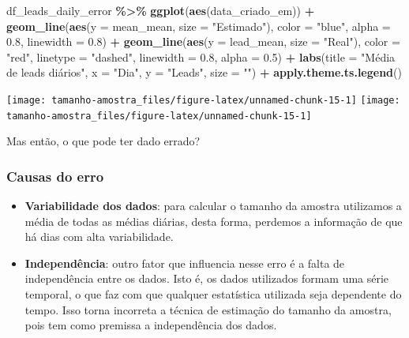 \documentclass[
]{article}
\newenvironment{Shaded}{\begin{snugshade}}{\end{snugshade}}
\newcommand{\AttributeTok}[1]{\textcolor[rgb]{0.13,0.29,0.53}{#1}}
\newcommand{\FloatTok}[1]{\textcolor[rgb]{0.00,0.00,0.81}{#1}}
\newcommand{\FunctionTok}[1]{\textcolor[rgb]{0.13,0.29,0.53}{\textbf{#1}}}
\newcommand{\NormalTok}[1]{#1}
\newcommand{\SpecialCharTok}[1]{\textcolor[rgb]{0.81,0.36,0.00}{\textbf{#1}}}
\newcommand{\StringTok}[1]{\textcolor[rgb]{0.31,0.60,0.02}{#1}}
\providecommand{\tightlist}{%
  \setlength{\itemsep}{0pt}\setlength{\parskip}{0pt}}
\begin{document}
\begin{Shaded}
\begin{Highlighting}[]
\NormalTok{df\_leads\_daily\_error }\SpecialCharTok{\%\textgreater{}\%}
  \FunctionTok{ggplot}\NormalTok{(}\FunctionTok{aes}\NormalTok{(data\_criado\_em)) }\SpecialCharTok{+}
  \FunctionTok{geom\_line}\NormalTok{(}\FunctionTok{aes}\NormalTok{(}\AttributeTok{y =}\NormalTok{ mean\_mean, }\AttributeTok{size =} \StringTok{"Estimado"}\NormalTok{), }\AttributeTok{color =} \StringTok{"blue"}\NormalTok{, }\AttributeTok{alpha =} \FloatTok{0.8}\NormalTok{, }\AttributeTok{linewidth =} \FloatTok{0.8}\NormalTok{) }\SpecialCharTok{+}
  \FunctionTok{geom\_line}\NormalTok{(}\FunctionTok{aes}\NormalTok{(}\AttributeTok{y =}\NormalTok{ lead\_mean, }\AttributeTok{size =} \StringTok{"Real"}\NormalTok{), }\AttributeTok{color =} \StringTok{"red"}\NormalTok{, }\AttributeTok{linetype =} \StringTok{"dashed"}\NormalTok{, }\AttributeTok{linewidth =} \FloatTok{0.8}\NormalTok{, }\AttributeTok{alpha =} \FloatTok{0.5}\NormalTok{) }\SpecialCharTok{+}
  \FunctionTok{labs}\NormalTok{(}\AttributeTok{title =} \StringTok{"Média de leads diários"}\NormalTok{,}
       \AttributeTok{x =} \StringTok{"Dia"}\NormalTok{,}
       \AttributeTok{y =} \StringTok{"Leads"}\NormalTok{,}
       \AttributeTok{size =} \StringTok{""}\NormalTok{) }\SpecialCharTok{+}
  \FunctionTok{apply.theme.ts.legend}\NormalTok{()}
\end{Highlighting}
\end{Shaded}

\begin{center}  { \texttt{[image: tamanho-amostra\_files/figure-latex/unnamed-chunk-15-1]} } { \texttt{[image: tamanho-amostra\_files/figure-latex/unnamed-chunk-15-1]} }  \end{center}

Mas então, o que pode ter dado errado?

\subsubsection{Causas do erro}\label{causas-do-erro}

\begin{itemize}
\tightlist
\item
  \textbf{Variabilidade dos dados}: para calcular o tamanho da amostra
  utilizamos a média de todas as médias diárias, desta forma, perdemos a
  informação de que há dias com alta variabilidade.
\item
  \textbf{Independência}: outro fator que influencia nesse erro é a
  falta de independência entre os dados. Isto é, os dados utilizados
  formam uma série temporal, o que faz com que qualquer estatística
  utilizada seja dependente do tempo. Isso torna incorreta a técnica de
  estimação do tamanho da amostra, pois tem como premissa a
  independência dos dados.
\end{itemize}
\end{document}
